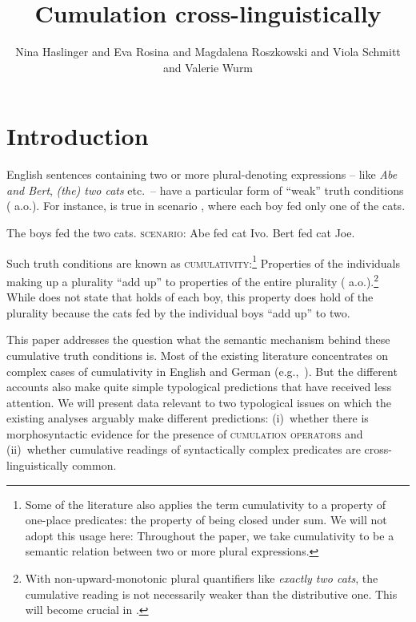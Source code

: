 \documentclass[output=paper]{langscibook}
\author{Nina Haslinger\affiliation{Georg-August-Universität Göttingen} and
Eva Rosina\affiliation{Universität Wien} and
Magdalena Roszkowski\affiliation{Central European University} and
Viola Schmitt\affiliation{Humboldt-Universität zu Berlin} and
Valerie Wurm\affiliation{Humboldt-Universität zu Berlin}}
\title{Cumulation cross-linguistically}
\begin{document}
\maketitle

\section{Introduction}\label{has-sch:sec:1}

English sentences containing two or more plural-denoting expressions -- like \textit{Abe and Bert}, \textit{(the) two cats} etc.~-- have a particular form of ``weak'' truth conditions (\citealt{Kroch:1974, Langendoen:1978, Scha:1981, Krifka:1986} a.o.). For instance,  is true in scenario , where each boy fed only one of the cats.

\ea \label{has-sch:1}
\ea\label{has-sch:1a} The boys fed the two cats. 
\ex\label{has-sch:1b} \textsc{scenario}: Abe fed cat Ivo. Bert fed cat Joe. 
\z\z

\noindent Such truth conditions are known as \textsc{cumulativity}:\footnote{Some of the literature also applies the term cumulativity to a property of one-place predicates: the property of being closed under sum. We will not adopt this usage here: Throughout the paper, we take cumulativity to be a semantic relation between two or more plural expressions.} Properties of the individuals making up a plurality ``add up'' to properties of the entire plurality (\citealt{Link:1983, Krifka:1986, Sternefeld:1998} a.o.).\footnote{With non-upward-monotonic plural quantifiers like \textit{exactly two cats}, the cumulative reading is not necessarily weaker than the distributive one. This will become crucial in .} While  does not state that  holds of each boy, this property does hold of the plurality  because the cats fed by the individual boys ``add up'' to two.

This paper addresses the question what the semantic mechanism behind these cumulative truth conditions is. Most of the existing literature concentrates on complex cases of cumulativity in English and German (e.g.,~\citealt{Schein:1993,Beck:2000a,Champollion:2010a,Schmitt:2019}). But the different accounts also make quite simple typological predictions that have received less attention. We will present data relevant to two typological issues on which the existing analyses arguably make different predictions: (i)~whether there is morphosyntactic evidence for the presence of \textsc{cumulation operators} and (ii)~whether cumulative readings of syntactically complex predicates are cross-linguistically common.
\end{document}
